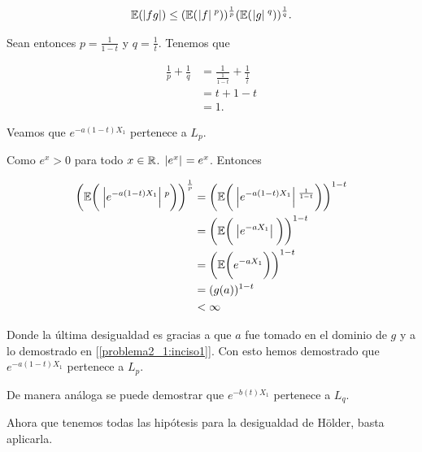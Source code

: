     \begin{align}
                \mathbb{E}(| fg |) \leq (\mathbb{E}(\hspace{.25mm}\left|f\right|\hspace{.25mm}^p))^{\frac{1}{p}} (\mathbb{E}(\hspace{.25mm}\left|g\right|\hspace{.25mm}^q))^\frac{1}{q}. \label{Desigualdad_de_Holder}
    \end{align}
    
    Sean entonces $p = \frac{1}{1-t}$ y $q = \frac{1}{t}$. Tenemos que\par\null
    
    \begin{align}
        \frac{1}{p} + \frac{1}{q}   &= \frac{1}{\frac{1}{1-t}} + \frac{1}{\frac{1}{t}}  \\
                                    &= t + 1 - t                                        \\ 
                                    &= 1.
    \end{align}
    
    Veamos que $e^{-a(1-t) X_1}$ pertenece a $L_p$.\par\null
    
    Como $e^x > 0$ para todo $x \in \mathbb{R}$. $\hspace{.25mm}\left|e^x\right|\hspace{.25mm} = e^x$. Entonces
    
    \begin{align}
         \bigg(\mathbb{E}\bigg(\hspace{.25mm}\left|e^{-a(1-t) X_1}\right|\hspace{.25mm}^p\bigg)\bigg)^{\frac{1}{p}} 
                &=  \bigg(\mathbb{E}\bigg(\hspace{.25mm}\left|e^{-a(1-t) X_1}\right|\hspace{.25mm}^{\frac{1}{1-t}}\bigg)\bigg)^{{1-t}} \\
                &=  \bigg(\mathbb{E}\bigg(\hspace{.25mm}\left|e^{-aX_1}\right|\hspace{.25mm}\bigg)\bigg)^{{1-t}}                       \\
                &=  \bigg(\mathbb{E}\bigg(e^{-aX_1}\bigg)\bigg)^{{1-t}}                             \\
                &=  ( g(a))^{{1-t}}                                                         \\
                &<   \infty
    \end{align}
    
    Donde la última desigualdad es gracias a que $a$ fue tomado en el dominio de $g$ y a lo demostrado en 
    [\ref{problema2_1:inciso1}]. Con esto hemos demostrado que $e^{-a(1-t) X_1}$ pertenece a $L_p$.\par\null
    
    De manera análoga se puede demostrar que $e^{-b(t) X_1}$ pertenece a $L_q$.\par\null
    
    Ahora que tenemos todas las hipótesis para la desigualdad de Hölder, basta aplicarla.\par\null
        
